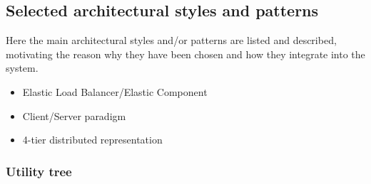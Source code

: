 \subsection{Selected architectural styles and patterns}

Here the main architectural styles and/or patterns are listed and described, motivating the reason why they have been chosen and how they integrate into the system.

\begin{itemize}
	\item Elastic Load Balancer/Elastic Component
	\item Client/Server paradigm
	\item 4-tier distributed representation
\end{itemize}

	\subsubsection{Utility tree}
